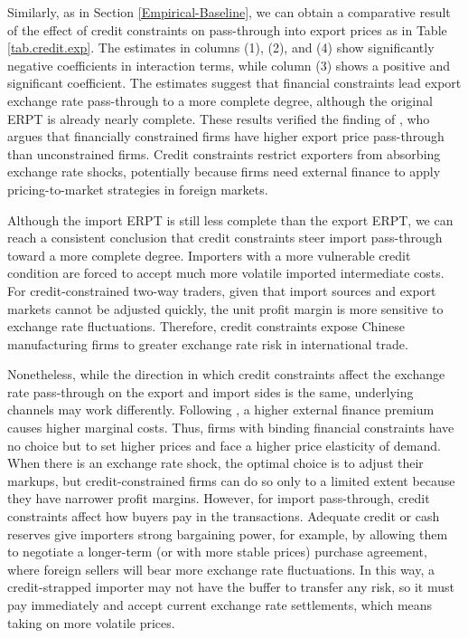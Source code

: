 Similarly, as in Section \ref{Empirical-Baseline}, we can obtain a comparative result of the effect of credit constraints on pass-through into export prices as in Table \ref{tab.credit.exp}. The estimates in columns (1), (2), and (4) show significantly negative coefficients in interaction terms, while column (3) shows a positive and significant coefficient. The estimates suggest that financial constraints lead export exchange rate pass-through to a more complete degree, although the original ERPT is already nearly complete. These results verified the finding of \cite{strasser2013}, who argues that financially constrained firms have higher export price pass-through than unconstrained firms. Credit constraints restrict exporters from absorbing exchange rate shocks, potentially because firms need external finance to apply pricing-to-market strategies in foreign markets.

Although the import ERPT is still less complete than the export ERPT, we can reach a consistent conclusion that credit constraints steer import pass-through toward a more complete degree. Importers with a more vulnerable credit condition are forced to accept much more volatile imported intermediate costs. For credit-constrained two-way traders, given that import sources and export markets cannot be adjusted quickly, the unit profit margin is more sensitive to exchange rate fluctuations. Therefore, credit constraints expose Chinese manufacturing firms to greater exchange rate risk in international trade.

Nonetheless, while the direction in which credit constraints affect the exchange rate pass-through on the export and import sides is the same, underlying channels may work differently. Following \cite{strasser2013}, a higher external finance premium causes higher marginal costs. Thus, firms with binding financial constraints have no choice but to set higher prices and face a higher price elasticity of demand. When there is an exchange rate shock, the optimal choice is to adjust their markups, but credit-constrained firms can do so only to a limited extent because they have narrower profit margins. However, for import pass-through, credit constraints affect how buyers pay in the transactions. Adequate credit or cash reserves give importers strong bargaining power, for example, by allowing them to negotiate a longer-term (or with more stable prices) purchase agreement, where foreign sellers will bear more exchange rate fluctuations. In this way, a credit-strapped importer may not have the buffer to transfer any risk, so it must pay immediately and accept current exchange rate settlements, which means taking on more volatile prices.

